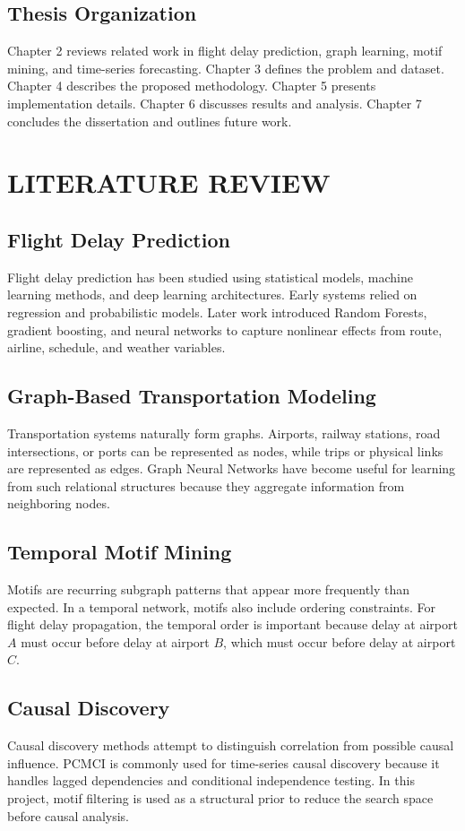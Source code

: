 \documentclass[12pt,a4paper]{report}
\begin{document}
\section{Thesis Organization}
Chapter 2 reviews related work in flight delay prediction, graph learning, motif mining, and time-series forecasting. Chapter 3 defines the problem and dataset. Chapter 4 describes the proposed methodology. Chapter 5 presents implementation details. Chapter 6 discusses results and analysis. Chapter 7 concludes the dissertation and outlines future work.

\chapter{LITERATURE REVIEW}
\noindent{\rule{\textwidth}{1.5pt}}

\section{Flight Delay Prediction}
Flight delay prediction has been studied using statistical models, machine learning methods, and deep learning architectures. Early systems relied on regression and probabilistic models. Later work introduced Random Forests, gradient boosting, and neural networks to capture nonlinear effects from route, airline, schedule, and weather variables.

\section{Graph-Based Transportation Modeling}
Transportation systems naturally form graphs. Airports, railway stations, road intersections, or ports can be represented as nodes, while trips or physical links are represented as edges. Graph Neural Networks have become useful for learning from such relational structures because they aggregate information from neighboring nodes.

\section{Temporal Motif Mining}
Motifs are recurring subgraph patterns that appear more frequently than expected. In a temporal network, motifs also include ordering constraints. For flight delay propagation, the temporal order is important because delay at airport $A$ must occur before delay at airport $B$, which must occur before delay at airport $C$.

\section{Causal Discovery}
Causal discovery methods attempt to distinguish correlation from possible causal influence. PCMCI is commonly used for time-series causal discovery because it handles lagged dependencies and conditional independence testing. In this project, motif filtering is used as a structural prior to reduce the search space before causal analysis.
\end{document}
